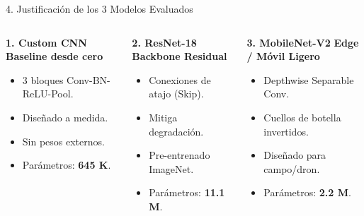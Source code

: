 \documentclass[aspectratio=169,10pt]{beamer}
\begin{document}
\begin{frame}{4. Justificación de los 3 Modelos Evaluados}
    \begin{columns}
        \begin{block}{\textbf{1. Custom CNN}}
            \small
            \textbf{Baseline desde cero}
            \begin{itemize}
                \footnotesize
                \item 3 bloques Conv-BN-ReLU-Pool.
                \item Diseñado a medida.
                \item Sin pesos externos.
                \item Parámetros: \textbf{645 K}.
            \end{itemize}
        \end{block}

        \begin{block}{\textbf{2. ResNet-18}}
            \small
            \textbf{Backbone Residual}
            \begin{itemize}
                \footnotesize
                \item Conexiones de atajo (Skip).
                \item Mitiga degradación.
                \item Pre-entrenado ImageNet.
                \item Parámetros: \textbf{11.1 M}.
            \end{itemize}
        \end{block}

        \begin{block}{\textbf{3. MobileNet-V2}}
            \small
            \textbf{Edge / Móvil Ligero}
            \begin{itemize}
                \footnotesize
                \item Depthwise Separable Conv.
                \item Cuellos de botella invertidos.
                \item Diseñado para campo/dron.
                \item Parámetros: \textbf{2.2 M}.
            \end{itemize}
        \end{block}
    \end{columns}
\end{frame}
\end{document}
